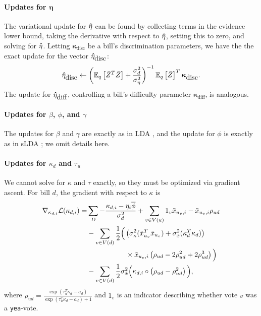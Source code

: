 \paragraph{Updates for $\bm \eta$}
The variational update for $\bm \hat \eta$ can be found by collecting terms in
the evidence lower bound, taking the derivative with respect to $\bm \hat \eta$,
setting this to zero, and solving for $\bm \hat \eta$.  Letting $\bm
\kappa_{\mbox{disc}}$ be a bill's discrimination parameters, we
have the the exact update for the vector $\bm \hat \eta_{\mbox{disc}}$:
\begin{align*}
\bm \hat \eta_{\mbox{disc}} \gets 
 \left(\mathbb{E}_q\left[\bar{Z}^T\bar{Z}\right] + \frac{\sigma_d^2}{\sigma_\eta^2 } \right)^{-1}
   \mathbb{E}_q\left[\bar{Z}\right]^T \bm \kappa_{\mbox{disc}}. \nonumber
\end{align*}
The update for $\bm \hat \eta_{\mbox{diff}}$, controlling a bill's difficulty parameter $\bm \kappa_{\mbox{diff}}$, is analogous.

\paragraph{Updates for $\beta$, $\phi$, and $\gamma$}
The updates for $\beta$ and $\gamma$ are exactly as in LDA
\cite{blei:2003}, and the update for $\phi$ is exactly as in sLDA
\cite{blei:2008}; we omit details here.

\paragraph{Updates for $\kappa_d$ and $\tau_u$}
We cannot solve for $\kappa$ and $\tau$ exactly, so they must be
optimized via gradient ascent.  For bill $d$, the gradient with
respect to $\kappa$ is
\begin{align}
\label{eq:kappa_update}
\hspace{-0pt}  \nabla_{\kappa_{d,i}} \mathcal{L}(\kappa_{d, i}) =
& \sum_{D} - \frac{\kappa_{d, i} - \eta_i \overline{\phi}}{\sigma^2_d} 
 +  \sum_{v \in V(u)} 1_v {\tilde x}_{u_v, i} - {\tilde x}_{u_v, i} \rho_{ud} \nonumber \\
 & - \sum_{v \in V(d)} \frac{1}{2}
     \Big( \left( \sigma_\kappa^2 ({\tilde x}_{u_v}^T {\tilde x}_{u_v}) + \sigma_{\tilde x}^2 (\kappa_d^T \kappa_d) \right) \nonumber \\
 & \hspace{55pt} \times {\tilde x}_{u_v, i} \left( \rho_{ud} - 2 \rho_{ud}^2 + 2 \rho_{ud}^3 \right) \Big) \nonumber \\
  &  - \sum_{v \in V(d)} \frac{1}{2} \sigma_{\tilde x}^2 \Big( \kappa_{d,i} \circ
     \left( \rho_{ud}
     - \rho_{ud}^2 \right) \Big), \nonumber
\end{align}
where $\rho_{ud} = \frac{\exp(\tau_u^T \kappa_d - a_d)}{\exp(\tau_u^T
  \kappa_d - a_d) + 1}$ and $1_v$ is an indicator describing whether
vote $v$ was a \verb!yea!-vote.


